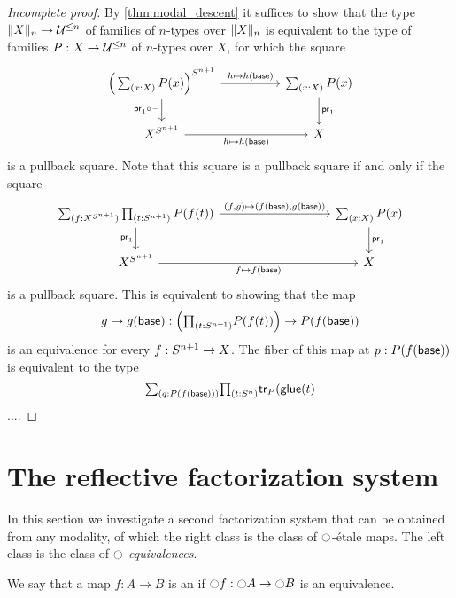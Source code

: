 \documentclass[9pt,twosided]{amsart}
\begin{document}
\begin{proof}[Incomplete proof]
By \cref{thm:modal_descent} it suffices to show that the type $\trunc{n}{X}\to\UU^{\leq n}$ of families of $n$-types over $\trunc{n}{X}$ is equivalent to the type of families $P:X\to\mathcal{U}^{\leq n}$ of $n$-types over $X$, for which the square
\begin{equation*}
\begin{tikzcd}[column sep=huge]
\Big(\sm{x:X}P(x)\Big)^{\sphere{n+1}} \arrow[r,"{h\mapsto h(\base)}"] \arrow[d,swap,"\proj 1\circ\blank"] & \sm{x:X}P(x) \arrow[d,"\proj 1"] \\
X^{\sphere{n+1}} \arrow[r,swap,"{h\mapsto h(\base)}"] & X
\end{tikzcd}
\end{equation*}
is a pullback square. Note that this square is a pullback square if and only if the square
\begin{equation*}
\begin{tikzcd}[column sep=9em]
\sm{f:X^{\sphere{n+1}}}\prd{t:\sphere{n+1}}P(f(t)) \arrow[r,"{(f,g)\mapsto (f(\base),g(\base))}"] \arrow[d,swap,"\proj 1"] & \sm{x:X}P(x) \arrow[d,"\proj 1"] \\
X^{\sphere{n+1}} \arrow[r,swap,"{f\mapsto f(\base)}"] & X
\end{tikzcd}
\end{equation*}
is a pullback square. This is equivalent to showing that the map
\begin{equation*}
g\mapsto g(\base):\Big(\prd{t:\sphere{n+1}}P(f(t))\Big)\to P(f(\base))
\end{equation*}
is an equivalence for every $f:S^{n+1}\to X$. The fiber of this map at $p:P(f(\mathsf{base}))$ is equivalent to the type
\begin{equation*}
\sm{q:P(f(\base))}\prd{t:\sphere{n}}\mathsf{tr}_P(\glue(t)
\end{equation*}
....
\end{proof}

\section{The reflective factorization system}

In this section we investigate a second factorization system that can be obtained from any modality, of which the right class is the class of ${\ocircle}$-\'etale maps. The left class is the class of \emph{${\ocircle}$-equivalences}.

\begin{defn}
We say that a map $f:A\to B$ is an  if ${\ocircle} f:{\ocircle} A\to {\ensuremath{\ocircle}} B$ is an equivalence.
\end{defn}
\end{document}
